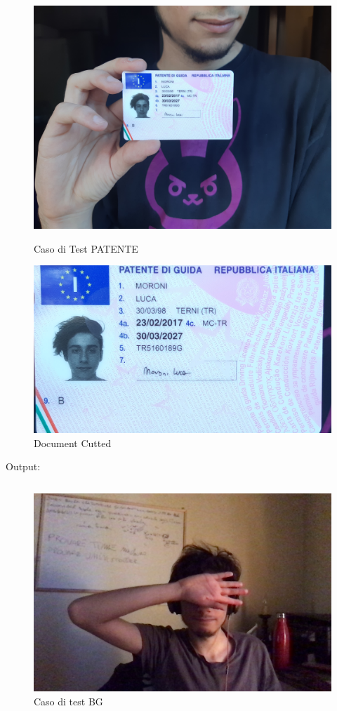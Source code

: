\documentclass[12pt,a4paper]{article}
\begin{document}
\begin{figure}[!htb]
   \begin{minipage}{0.48\textwidth}
     \centering
     \includegraphics[width=.7\linewidth]{test_patente.jpg}
     \caption{Caso di Test PATENTE}\label{Fig:}
   \end{minipage}\hfill
   \begin{minipage}{0.48\textwidth}
     \centering
     \includegraphics[width=.7\linewidth]{test_patente_cutting.jpg}
     \caption{Document Cutted}\label{Fig:}
   \end{minipage}
\end{figure}

Output:
\inputminted{python}{test\_patente.py}

\begin{figure}[H]
    \caption{Caso di test BG}
    \centering
    \includegraphics[width=\textwidth,height=\textheight,keepaspectratio]{test_background.jpg}
\end{figure}
\end{document}
